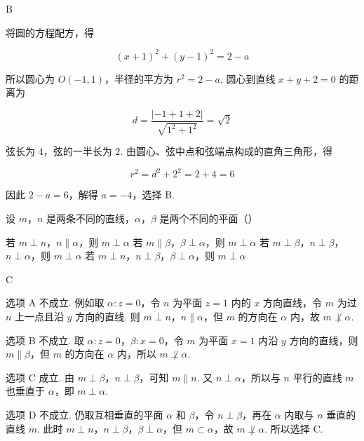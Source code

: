 \begin{answer}
B
\end{answer}

\begin{solution}
将圆的方程配方，得

\[
(x+1)^{2}+(y-1)^{2}=2-a
\]

所以圆心为 \(O(-1,1)\)，半径的平方为 \(r^{2}=2-a\). 圆心到直线 \(x+y+2=0\) 的距离为

\[
d=\frac{|-1+1+2|}{\sqrt{1^{2}+1^{2}}}=\sqrt{2}
\]

弦长为 \(4\)，弦的一半长为 \(2\). 由圆心、弦中点和弦端点构成的直角三角形，得

\[
r^{2}=d^{2}+2^{2}=2+4=6
\]

因此 \(2-a=6\)，解得 \(a=-4\)，选择 B.
\end{solution}

\begin{problem}
设 \(m\)，\(n\) 是两条不同的直线，\(\alpha\)，\(\beta\) 是两个不同的平面（\quad）

\choices
    {若 \(m \perp n\)，\(n \parallel \alpha\)，则 \(m \perp \alpha\)}
    {若 \(m \parallel \beta\)，\(\beta \perp \alpha\)，则 \(m \perp \alpha\)}
    {若 \(m \perp \beta\)，\(n \perp \beta\)，\(n \perp \alpha\)，则 \(m \perp \alpha\)}
    {若 \(m \perp n\)，\(n \perp \beta\)，\(\beta \perp \alpha\)，则 \(m \perp \alpha\)}
\end{problem}

\begin{answer}
C
\end{answer}

\begin{solution}
选项 A 不成立. 例如取 \(\alpha:z=0\)，令 \(n\) 为平面 \(z=1\) 内的 \(x\) 方向直线，令 \(m\) 为过 \(n\) 上一点且沿 \(y\) 方向的直线. 则 \(m\perp n\)，\(n\parallel\alpha\)，但 \(m\) 的方向在 \(\alpha\) 内，故 \(m\not\perp\alpha\).

选项 B 不成立. 取 \(\alpha:z=0\)，\(\beta:x=0\)，令 \(m\) 为平面 \(x=1\) 内沿 \(y\) 方向的直线，则 \(m\parallel\beta\)，但 \(m\) 的方向在 \(\alpha\) 内，所以 \(m\not\perp\alpha\).

选项 C 成立. 由 \(m\perp\beta\)，\(n\perp\beta\)，可知 \(m\parallel n\). 又 \(n\perp\alpha\)，所以与 \(n\) 平行的直线 \(m\) 也垂直于 \(\alpha\)，即 \(m\perp\alpha\).

选项 D 不成立. 仍取互相垂直的平面 \(\alpha\) 和 \(\beta\)，令 \(n\perp\beta\)，再在 \(\alpha\) 内取与 \(n\) 垂直的直线 \(m\). 此时 \(m\perp n\)，\(n\perp\beta\)，\(\beta\perp\alpha\)，但 \(m\subset\alpha\)，故 \(m\not\perp\alpha\). 所以选择 C.
\end{solution}

